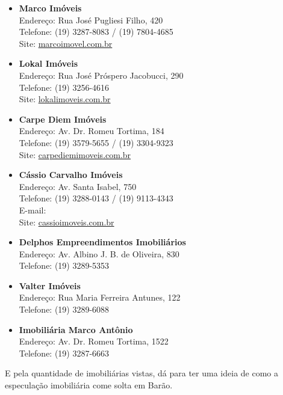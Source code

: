 \begin{itemize}
    \item   \textbf{Marco Imóveis}
        \\Endereço: Rua José Pugliesi Filho, 420
        \\Telefone: (19) 3287-8083 / (19) 7804-4685
        \\Site: \url{marcoimovel.com.br}

    \item   \textbf{Lokal Imóveis}
        \\Endereço: Rua José Próspero Jacobucci, 290
        \\Telefone: (19) 3256-4616
        \\Site: \url{lokalimoveis.com.br}

    \item   \textbf{Carpe Diem Imóveis}
        \\Endereço: Av. Dr. Romeu Tortima, 184
        \\Telefone: (19) 3579-5655 / (19) 3304-9323
        \\Site: \url{carpediemimoveis.com.br}

    \item   \textbf{Cássio Carvalho Imóveis}
        \\Endereço: Av. Santa Isabel, 750
        \\Telefone: (19) 3288-0143 / (19) 9113-4343
        \\E-mail: 
        \\Site: \url{cassioimoveis.com.br}

    \item   \textbf{Delphos Empreendimentos Imobiliários}
        \\Endereço: Av. Albino J. B. de Oliveira, 830
        \\Telefone: (19) 3289-5353

    \item   \textbf{Valter Imóveis}
        \\Endereço: Rua Maria Ferreira Antunes, 122
        \\Telefone: (19) 3289-6088

    \item   \textbf{Imobiliária Marco Antônio}
        \\Endereço: Av. Dr. Romeu Tortima, 1522
        \\Telefone: (19) 3287-6663

\end{itemize}

E pela quantidade de imobiliárias vistas, dá para ter uma ideia de como a 
especulação imobiliária come solta em Barão.
